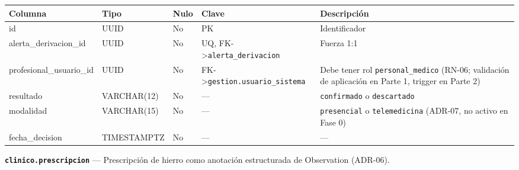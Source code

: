 \documentclass[11pt,a4paper]{article}
\begin{document}
{\small
\begin{longtable}[]{@{}
  >{\raggedright\arraybackslash}p{}
  >{\raggedright\arraybackslash}p{}
  >{\raggedright\arraybackslash}p{}
  >{\raggedright\arraybackslash}p{}
  >{\raggedright\arraybackslash}p{}@{}}
\toprule\noalign{}
\begin{minipage}[b]{\linewidth}\raggedright
Columna
\end{minipage} & \begin{minipage}[b]{\linewidth}\raggedright
Tipo
\end{minipage} & \begin{minipage}[b]{\linewidth}\raggedright
Nulo
\end{minipage} & \begin{minipage}[b]{\linewidth}\raggedright
Clave
\end{minipage} & \begin{minipage}[b]{\linewidth}\raggedright
Descripción
\end{minipage} \\
\midrule\noalign{}
\endhead
\bottomrule\noalign{}
\endlastfoot
id & UUID & No & PK & Identificador \\
alerta\_derivacion\_id & UUID & No & UQ, FK-\textgreater{}\texttt{alerta\_derivacion} & Fuerza 1:1 \\
profesional\_usuario\_id & UUID & No & FK-\textgreater{}\texttt{gestion.usuario\_sistema} & Debe tener rol \texttt{personal\_medico} (RN-06; validación de aplicación en Parte 1, trigger en Parte 2) \\
resultado & VARCHAR(12) & No & --- & \texttt{confirmado} o \texttt{descartado} \\
modalidad & VARCHAR(15) & No & --- & \texttt{presencial} o \texttt{telemedicina} (ADR-07, no activo en Fase 0) \\
fecha\_decision & TIMESTAMPTZ & No & --- & --- \\
\end{longtable}
}

\textbf{\texttt{clinico.prescripcion}} --- Prescripción de hierro como anotación estructurada de Observation (ADR-06).
\end{document}
